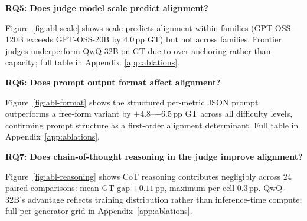 \textbf{RQ5: Does judge model scale predict alignment?}
\label{sec:abl:scale}

Figure~\ref{fig:abl-scale} shows scale predicts alignment within families (GPT-OSS-120B exceeds GPT-OSS-20B by $4.0$\,pp GT) but not across families. Frontier judges underperform QwQ-32B on GT due to over-anchoring rather than capacity; full table in Appendix~\ref{app:ablations}.

\textbf{RQ6: Does prompt output format affect alignment?}
\label{sec:abl:format}

Figure~\ref{fig:abl-format} shows the structured per-metric JSON prompt outperforms a free-form variant by $+4.8$--$+6.5$\,pp GT across all difficulty levels, confirming prompt structure as a first-order alignment determinant. Full table in Appendix~\ref{app:ablations}.

\textbf{RQ7: Does chain-of-thought reasoning in the judge improve alignment?}
\label{sec:abl:reasoning}

Figure~\ref{fig:abl-reasoning} shows CoT reasoning contributes negligibly across 24 paired comparisons: mean GT gap $+0.11$\,pp, maximum per-cell $0.3$\,pp. QwQ-32B's advantage reflects training distribution rather than inference-time compute; full per-generator grid in Appendix~\ref{app:ablations}.
